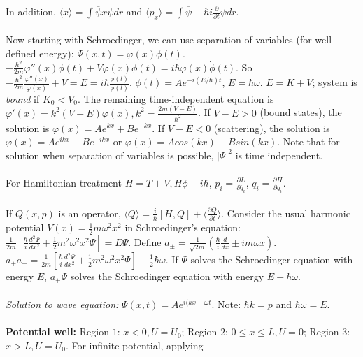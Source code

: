 In addition, 
$\langle x \rangle = \int \overline{\psi} x \psi dr$ and
$\langle p_x \rangle = \int \overline{\psi} - \hbar i {\frac {\partial} {\partial t}} \psi dr$.
\\
\\
Now starting with Schroedinger, we can use separation of variables (for well defined
energy): $\Psi(x,t)= \varphi(x) \phi(t)$. 
$-{\frac {\hbar^2} {2m}} \varphi''(x) \phi(t) + 
V \varphi(x) \phi(t)= i \hbar \varphi(x) {\dot \phi}(t)$. 
So $-{\frac {\hbar^2} {2m}} {\frac {\varphi''(x)} {\varphi(x)}} + V = E=
i \hbar {\frac {{\dot \phi}(t)} {\phi(t)}}$. $\phi(t)= A e^{-i(E/\hbar)t}$,
$E= \hbar \omega$.  $E=K+V$; system is \emph{bound} if $K_0<V_0$.  The
remaining time-independent equation is
$\varphi'(x)= k^2 (V-E) \varphi(x), k^2= {\frac {2m(V-E)} {\hbar^2}}$.  
If $V-E>0$ (bound states), the solution is 
$\varphi(x)= A e^{kx}+ B e^{-kx}$.
If $V-E<0$ (scattering), the solution is 
$\varphi(x)= A e^{ikx}+ B e^{-ikx}$ or
$\varphi(x)= A cos(kx)+ B sin(kx)$.
Note that for solution when separation of variables is possible, $|\Psi|^2$ is time 
independent.  \\
\\
For Hamiltonian treatment
$H= T+V, H \phi - i \hbar$, $p_i = {\frac {\partial L}{\partial {\dot{q_i}}}}$,
$\dot{q_i} = {\frac {\partial H} {\partial {q_i}}}$.
\\
\\
If $Q(x,p)$ is an operator,
$\langle Q \rangle = {\frac {i} {\hbar}} [H, Q] + \langle {\frac {\partial Q} {\partial t}} \rangle$.
Consider the usual harmonic potential $V(x) = {\frac 1 2} m \omega^2 x^2$ in Schroedinger's equation:
${\frac {1} {2m}}[{\frac {\hbar} {i}} {\frac {d^2 \Psi}{dx^2}} + {\frac 1 2} m^2 \omega^2 x^2 \Psi]= E \Psi$.
Define $a_{\pm} = {\frac 1 {\sqrt {2m}}} ({\frac {\hbar} {i}} {\frac d {dx}} \pm i m \omega x)$.
$a_+ a_- = {\frac {1} {2m}}[{\frac {\hbar} {i}} {\frac {d^2 \Psi}{dx^2}} + {\frac 1 2} m^2 \omega^2 x^2 \Psi] - 
{\frac 1 2} \hbar \omega$.  If $\Psi$ solves the Schroedinger equation with energy $E$, $a_+ \Psi$  solves
the Schroedinger equation with energy $E + \hbar \omega$.\\
\\
\emph{Solution to wave equation:} $\Psi(x, t) = A e^{i(kx- \omega t}$.  Note: $\hbar k = p$ and $\hbar \omega = E$.
\\
\\
{\bf Potential well:}  
Region $1$: $x<0, U=U_0$; 
Region $2$: $0 \le x \le L, U=0$; 
Region $3$: $x > L, U=U_0$.  
For infinite potential, applying
